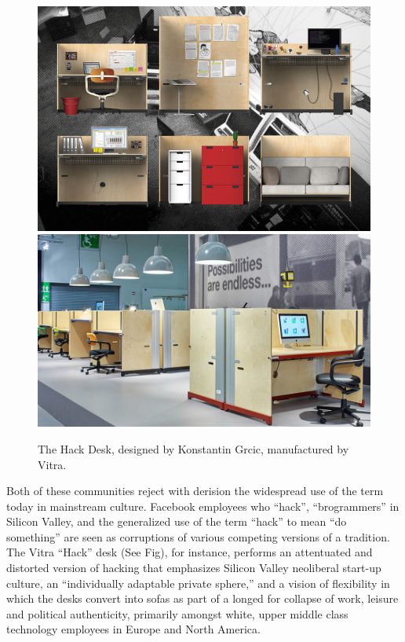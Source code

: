 \documentclass[10pt,letter,oneside]{scrartcl}
\begin{document}
\begin{figure} \centering
\includegraphics[scale=0.6]{images/Workspirit13HACKStudioAKFB3}
\includegraphics[scale=0.4]{images/HackDeskGrcic} \caption{The Hack Desk,
designed by Konstantin Grcic, manufactured by Vitra.} \label{fig:hackdeskimage}
\end{figure}

Both of these communities reject with derision the widespread use of the term
today in mainstream culture.  Facebook employees who ``hack'', ``brogrammers''
in Silicon Valley, and the generalized use of the term ``hack'' to mean ``do
something'' are seen as corruptions of various competing versions of a tradition.   
The Vitra ``Hack'' desk (See Fig), for instance, performs an attentuated and 
distorted version of hacking that emphasizes Silicon Valley neoliberal start-up 
culture, an ``individually adaptable private sphere,'' and a vision of flexibility 
in which the desks convert into sofas as part of a longed for collapse of work, 
leisure and political authenticity, primarily amongst white, upper middle class
technology employees in Europe and North America. 
\end{document}
